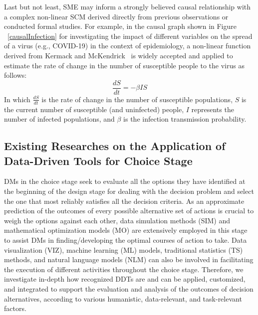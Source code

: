 \documentclass{sfuthesis}
\begin{document}
Last but not least, SME may inform a strongly believed causal relationship with a complex non-linear SCM derived directly from previous observations or conducted formal studies. For example, in the causal graph shown in Figure ~\ref{causalInfection} for investigating the impact of different variables on the spread of a virus (e.g., COVID-19) in the context of epidemiology, a non-linear function derived from Kermack and McKendrick~\cite{kermack1927contribution} is widely accepted and applied to estimate the rate of change in the number of susceptible people to the virus as follows:
\begin{equation}
    \frac{dS}{dt}=-\beta I S
\end{equation}
In which $\frac{dS}{dt}$ is the rate of change in the number of susceptible populations, $S$ is the current number of susceptible (and uninfected) people, $I$ represents the number of infected populations, and $\beta$ is the infection transmission probability.

\subsection{Existing Researches on the Application of Data-Driven Tools for Choice Stage} \label{ExistingResearchChoice}
DMs in the choice stage seek to evaluate all the options they have identified at the beginning of the design stage for dealing with the decision problem and select the one that most reliably satisfies all the decision criteria. As an approximate prediction of the outcomes of every possible alternative set of actions is crucial to weigh the options against each other, data simulation methods (SIM) and mathematical optimization models (MO) are extensively employed in this stage to assist DMs in finding/developing the optimal courses of action to take. Data visualization (VIZ), machine learning (ML) models, traditional statistics (TS) methods, and natural language models (NLM) can also be involved in facilitating the execution of different activities throughout the choice stage. Therefore, we investigate in-depth how recognized DDTs are and can be applied, customized, and integrated to support the evaluation and analysis of the outcomes of decision alternatives, according to various humanistic, data-relevant, and task-relevant factors.
\end{document}
